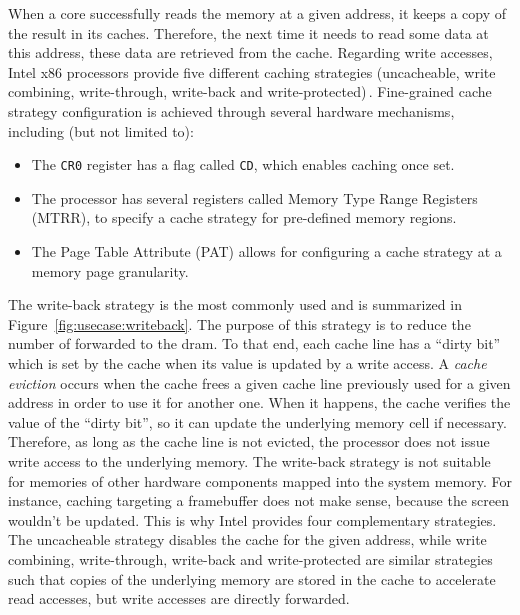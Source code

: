 When a core successfully reads the memory at a given address, it keeps a copy of
the result in its caches.
%
Therefore, the next time it needs to read some data at this address, these data
are retrieved from the cache.
%
Regarding write accesses, Intel x86 processors provide five different caching
strategies (uncacheable, write combining, write-through, write-back and
write-protected)\,\cite[Volume 3, Chapter~11]{intel2014manual}.
%
Fine-grained cache strategy configuration is achieved through several hardware
mechanisms, including (but not limited to):
%
\begin{itemize}
\item The \texttt{CR0} register has a flag called \texttt{CD}, which enables
  caching once set.
%
\item The processor has several registers called Memory Type Range Registers
  (MTRR), to specify a cache strategy for pre-defined memory regions.
%
\item The Page Table Attribute (PAT) allows for configuring a cache strategy at
  a memory page granularity.
\end{itemize}
%
The write-back strategy is the most commonly used and is summarized in
Figure~\ref{fig:usecase:writeback}.
%
The purpose of this strategy is to reduce the number of \IO forwarded to the
\ac{dram}.
%
To that end, each cache line has a ``dirty bit'' which is set by the cache when
its value is updated by a write access.
%
A \emph{cache eviction} occurs when the cache frees a given cache line
previously used for a given address in order to use it for another one.
%
When it happens, the cache verifies the value of the ``dirty bit'', so it can
update the underlying memory cell if necessary.
%
Therefore, as long as the cache line is not evicted, the processor does not
issue write access to the underlying memory.
%
The write-back strategy is not suitable for memories of other hardware
components mapped into the system memory.
%
For instance, caching \IOs targeting a framebuffer does not make sense, because
the screen wouldn't be updated.
%
This is why Intel provides four complementary strategies.
%
The uncacheable strategy disables the cache for the given address, while write
combining, write-through, write-back and write-protected are similar strategies
such that copies of the underlying memory are stored in the cache to accelerate
read accesses, but write accesses are directly forwarded.


